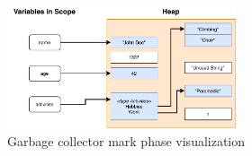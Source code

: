 \begin{figure}[htp!]
    \centering
    \includegraphics[width=0.6\textwidth]{assets/figures/chapter3/gc-visualization.pdf}
    \caption{Garbage collector mark phase visualization}
    \label{fig:gc-visualization}
\end{figure}
